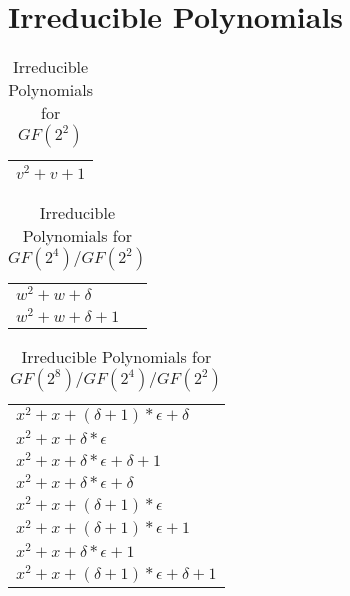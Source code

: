 \documentclass[12pt]{article}
\begin{document}
\section{Irreducible Polynomials}

\begin{center}
\begin{longtable}{|l|}
\caption[INNER TITLE]{Irreducible Polynomials for $GF(2^2)$}\\
\hline
	$v^2 + v + 1$ \\
\hline
\end{longtable}
\end{center}

\begin{center}
\begin{longtable}{|l|}
\caption[INNER TITLE]{Irreducible Polynomials for $GF(2^4)/GF(2^2)$}\\
\hline
	$w^2 + w + \delta$ \\
	$w^2 + w + \delta + 1$ \\
\hline
\end{longtable}
\end{center}

\begin{center}
\begin{longtable}{|l|}
\caption[INNER TITLE]{Irreducible Polynomials for $GF(2^8)/GF(2^4)/GF(2^2)$}\\
\hline
	$x^2 + x + (\delta + 1)*\epsilon + \delta$ \\
	$x^2 + x + \delta*\epsilon$ \\
	$x^2 + x + \delta*\epsilon + \delta + 1$ \\
	$x^2 + x + \delta*\epsilon + \delta$ \\
	$x^2 + x + (\delta + 1)*\epsilon$ \\
	$x^2 + x + (\delta + 1)*\epsilon + 1$ \\
	$x^2 + x + \delta*\epsilon + 1$ \\
	$x^2 + x + (\delta + 1)*\epsilon + \delta + 1$ \\
\hline
\end{longtable}
\end{center}
\end{document}

